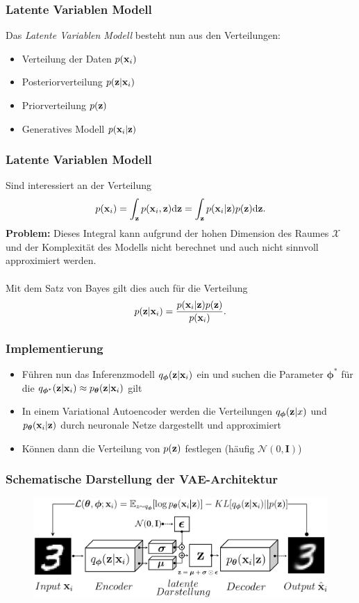 \begin{frame}
	\frametitle{Latente Variablen Modell}
	Das \emph{Latente Variablen Modell} besteht nun aus den Verteilungen:
	\begin{itemize}
		\item Verteilung der Daten $p(\mathbf{x}_i)$
		\item Posteriorverteilung $p(\mathbf{z}|\mathbf{x}_i)$
		\item Priorverteilung $p(\mathbf{z})$
		\item Generatives Modell $p(\mathbf{x}_i|\mathbf{z})$
	\end{itemize}
\end{frame}

\begin{frame}
	\frametitle{Latente Variablen Modell}
	Sind interessiert an der Verteilung
	\[p(\mathbf{x}_i)= \int_{\mathbf{z}} p(\mathbf{x}_i,\mathbf{z}) \mathrm{d}\textbf{z} = \int_{\mathbf{z}} p(\mathbf{x}_i|\mathbf{z})p(\mathbf{z}) \mathrm{d}\mathbf{z}.\]
	\textbf{Problem:} Dieses Integral kann aufgrund der hohen Dimension des Raumes $\mathcal{X}$ und der Komplexität des Modells 
	nicht berechnet und auch nicht sinnvoll approximiert werden. \\ \ 
	\\
	Mit dem Satz von Bayes gilt dies auch für die Verteilung
	\[p(\mathbf{z}|\mathbf{x}_i)= \frac{p(\mathbf{x}_i|\mathbf{z})p(\mathbf{z})}{p(\mathbf{x}_i)}.\]
\end{frame}

\begin{frame}
	\frametitle{Implementierung}
		\begin{itemize}
		\item Führen nun das Inferenzmodell $q_{\boldsymbol\phi}(\mathbf{z}|\mathbf{x}_i)$ ein und suchen die Parameter $\boldsymbol\phi^{*}$ für die $q_{\boldsymbol\phi^{*}}(\mathbf{z}|\mathbf{x}_i) \approx p_{\boldsymbol\theta}(\mathbf{z}|\mathbf{x}_i)$ gilt 
		\item In einem Variational Autoencoder werden die Verteilungen $q_{\boldsymbol\phi}(\mathbf{z}|x)$ und $p_{\boldsymbol\theta}(\mathbf{x}_i|\mathbf{z})$ durch neuronale Netze dargestellt und approximiert
		\item Können dann die Verteilung von $p(\mathbf{z})$ festlegen (häufig $\mathcal{N}(0,\textbf{I})$)
	\end{itemize}
\end{frame}

\begin{frame}
	\frametitle{Schematische Darstellung der VAE-Architektur}
	\begin{figure}[htbp!]
		\includegraphics[scale=0.27]{Bilder/VAE-Modell.PNG}
	\end{figure}
\end{frame}